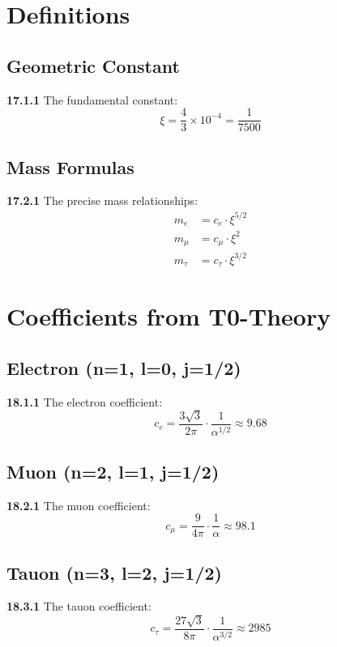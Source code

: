 \section{Definitions}

\subsection{Geometric Constant}
\noindent \textbf{17.1.1} The fundamental constant:
\begin{equation}
	\xi = \frac{4}{3} \times 10^{-4} = \frac{1}{7500}
\end{equation}

\subsection{Mass Formulas}
\noindent \textbf{17.2.1} The precise mass relationships:
\begin{align}
	m_e &= c_e \cdot \xi^{5/2} \\
	m_\mu &= c_\mu \cdot \xi^2 \\
	m_\tau &= c_\tau \cdot \xi^{3/2}
\end{align}

\section{Coefficients from T0-Theory}

\subsection{Electron (n=1, l=0, j=1/2)}
\noindent \textbf{18.1.1} The electron coefficient:
\begin{equation}
	c_e = \frac{3\sqrt{3}}{2\pi} \cdot \frac{1}{\alpha^{1/2}} \approx 9.68
\end{equation}

\subsection{Muon (n=2, l=1, j=1/2)}
\noindent \textbf{18.2.1} The muon coefficient:
\begin{equation}
	c_\mu = \frac{9}{4\pi} \cdot \frac{1}{\alpha} \approx 98.1
\end{equation}

\subsection{Tauon (n=3, l=2, j=1/2)}
\noindent \textbf{18.3.1} The tauon coefficient:
\begin{equation}
	c_\tau = \frac{27\sqrt{3}}{8\pi} \cdot \frac{1}{\alpha^{3/2}} \approx 2985
\end{equation}


